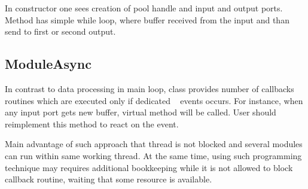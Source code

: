 In constructor one sees creation of pool handle and input and output ports.
Method  has simple while loop, where buffer received from the
input and than send to first or second output.
  
\subsection{ModuleAsync}
\label{plugin_module_async}

In contrast to data processing in  main loop,
class  provides 
number of callbacks routines which are executed only if dedicated \dabc~ events occurs.
For instance, when any input port gets new buffer, virtual method  will
be called. User should reimplement this method to react on the event.

Main advantage of such approach that thread is not blocked and
several modules  can run within same working thread.
At the same time, using such programming technique may requires additional 
bookkeeping while it is not allowed to block callback routine, waiting that
some resource is available.

